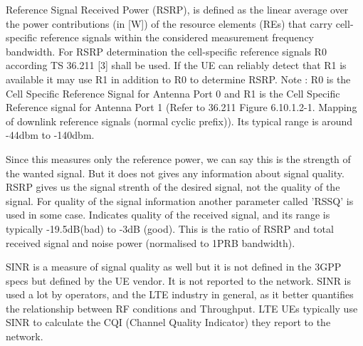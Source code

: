 
Reference Signal Received Power (RSRP), is defined as the linear average over the power contributions (in [W]) of the resource elements (REs) that carry cell-specific reference signals within the considered measurement frequency bandwidth. For RSRP determination the cell-specific reference signals R0 according TS 36.211 [3] shall be used. If the UE can reliably detect that R1 is available it may use R1 in addition to R0 to determine RSRP. Note : R0 is the Cell Specific Reference Signal for Antenna Port 0 and R1 is the Cell Specific Reference signal for Antenna Port 1 (Refer to 36.211 Figure 6.10.1.2-1. Mapping of downlink reference signals (normal cyclic prefix)).  Its typical range is around -44dbm  to -140dbm. 

Since this measures only the reference power, we can say this is the strength of the wanted signal. But it does not gives any information about signal quality. RSRP gives us the signal strenth of the desired signal, not the quality of  the signal. For quality of the signal information another parameter called 'RSSQ' is used in some case. Indicates quality of the received signal, and its range is typically -19.5dB(bad) to -3dB (good). This is the ratio of RSRP and total received signal and noise power (normalised to 1PRB bandwidth).

SINR is a measure of signal quality as well but it is not defined in the 3GPP specs but defined by the UE vendor. It is not reported to the network. SINR is used a lot by operators, and the LTE industry in general, as it better quantifies the relationship between RF conditions and Throughput. LTE UEs typically use SINR to calculate the CQI (Channel Quality Indicator) they report to the network.

%
%

